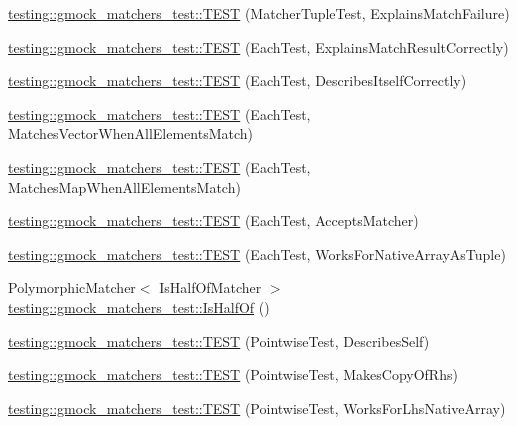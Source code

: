 \begin{DoxyCompactItemize}
\item 
\mbox{\hyperlink{namespacetesting_1_1gmock__matchers__test_abc9816afa3c83fc92e2c6ecfb2dd8e63}{testing\+::gmock\+\_\+matchers\+\_\+test\+::\+T\+E\+ST}} (Matcher\+Tuple\+Test, Explains\+Match\+Failure)
\item 
\mbox{\hyperlink{namespacetesting_1_1gmock__matchers__test_adf46df588332aa839b52af952fface1a}{testing\+::gmock\+\_\+matchers\+\_\+test\+::\+T\+E\+ST}} (Each\+Test, Explains\+Match\+Result\+Correctly)
\item 
\mbox{\hyperlink{namespacetesting_1_1gmock__matchers__test_a183c4b7acec060c6fe3dee650bc97e6d}{testing\+::gmock\+\_\+matchers\+\_\+test\+::\+T\+E\+ST}} (Each\+Test, Describes\+Itself\+Correctly)
\item 
\mbox{\hyperlink{namespacetesting_1_1gmock__matchers__test_a1310e7e85bf8ea8f2281850167e15465}{testing\+::gmock\+\_\+matchers\+\_\+test\+::\+T\+E\+ST}} (Each\+Test, Matches\+Vector\+When\+All\+Elements\+Match)
\item 
\mbox{\hyperlink{namespacetesting_1_1gmock__matchers__test_a53e7c1a04b8f178af52eeaa9f190cb64}{testing\+::gmock\+\_\+matchers\+\_\+test\+::\+T\+E\+ST}} (Each\+Test, Matches\+Map\+When\+All\+Elements\+Match)
\item 
\mbox{\hyperlink{namespacetesting_1_1gmock__matchers__test_a74f7c802ddb6879d3c76ff08d3e242b9}{testing\+::gmock\+\_\+matchers\+\_\+test\+::\+T\+E\+ST}} (Each\+Test, Accepts\+Matcher)
\item 
\mbox{\hyperlink{namespacetesting_1_1gmock__matchers__test_aef6eeafb03f698d16206836bbb6f05b9}{testing\+::gmock\+\_\+matchers\+\_\+test\+::\+T\+E\+ST}} (Each\+Test, Works\+For\+Native\+Array\+As\+Tuple)
\item 
Polymorphic\+Matcher$<$ Is\+Half\+Of\+Matcher $>$ \mbox{\hyperlink{namespacetesting_1_1gmock__matchers__test_ace0a8f64b108c7a9c32c2cac15185461}{testing\+::gmock\+\_\+matchers\+\_\+test\+::\+Is\+Half\+Of}} ()
\item 
\mbox{\hyperlink{namespacetesting_1_1gmock__matchers__test_a2c4c39058405e13e6c6b7fcf8e6bfe43}{testing\+::gmock\+\_\+matchers\+\_\+test\+::\+T\+E\+ST}} (Pointwise\+Test, Describes\+Self)
\item 
\mbox{\hyperlink{namespacetesting_1_1gmock__matchers__test_a9be60ebc74e280d7eb6668bfa316a765}{testing\+::gmock\+\_\+matchers\+\_\+test\+::\+T\+E\+ST}} (Pointwise\+Test, Makes\+Copy\+Of\+Rhs)
\item 
\mbox{\hyperlink{namespacetesting_1_1gmock__matchers__test_ad0e797104a482eba2d6c137cf9b676a5}{testing\+::gmock\+\_\+matchers\+\_\+test\+::\+T\+E\+ST}} (Pointwise\+Test, Works\+For\+Lhs\+Native\+Array)

\end{DoxyCompactItemize}
